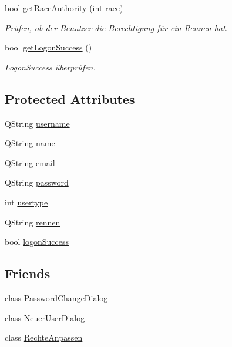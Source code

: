 \begin{CompactItemize}
bool \hyperlink{class_user_1aa3e9682d94bd9c6c8d6c1e2d90d02a}{getRaceAuthority} (int race)
\begin{CompactList}\small\item\em Prüfen, ob der Benutzer die Berechtigung für ein Rennen hat. \item\end{CompactList}\item 
bool \hyperlink{class_user_58c0c89c438e6091bb8e056b421efed6}{getLogonSuccess} ()
\begin{CompactList}\small\item\em LogonSuccess überprüfen. \item\end{CompactList}\end{CompactItemize}
\subsection*{Protected Attributes}
\begin{CompactItemize}
\item 
QString \hyperlink{class_user_e4202de2b7974e92a55b913d20b03833}{username}
\item 
QString \hyperlink{class_user_182c8e0056fab1df2af8318cc3f5c058}{name}
\item 
QString \hyperlink{class_user_5b7a66a134d017ae18c2d1464f34eb67}{email}
\item 
QString \hyperlink{class_user_c887622f22a898c097d156ad964be846}{password}
\item 
int \hyperlink{class_user_29cdee57f89b7c6f43eb656c7658ed60}{usertype}
\item 
QString \hyperlink{class_user_b5f525a8d6723eada2dd17ecb057a464}{rennen}
\item 
bool \hyperlink{class_user_62dd92fabb3f0cf42c9cebbb7875b879}{logonSuccess}
\end{CompactItemize}
\subsection*{Friends}
\begin{CompactItemize}
\item 
class \hyperlink{class_user_2d41462495b9d75be015c70b749702a6}{PasswordChangeDialog}
\item 
class \hyperlink{class_user_25239d16a03334074a70ce4f9301d56d}{NeuerUserDialog}
\item 
class \hyperlink{class_user_3fffb2093eb859119c4d500dd91ae8cc}{RechteAnpassen}
\end{CompactItemize}


